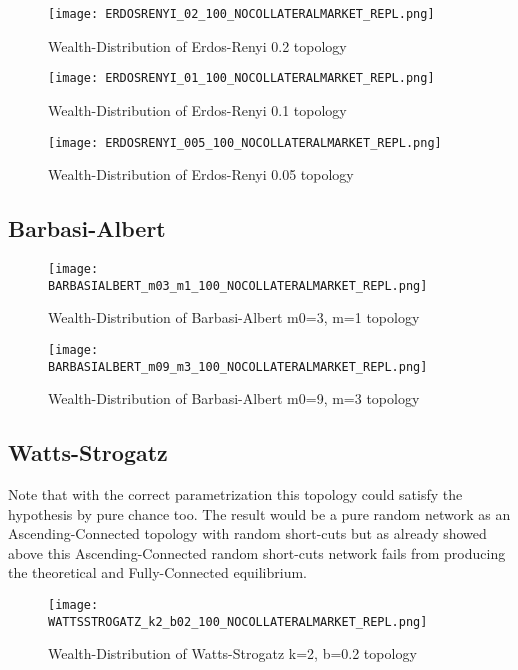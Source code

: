 \documentclass[Bachelorarbeit.tex]{subfiles}
\begin{document}
\begin{figure}[H]
	\centering
  \texttt{[image: ERDOSRENYI\_02\_100\_NOCOLLATERALMARKET\_REPL.png]}
	\caption{Wealth-Distribution of Erdos-Renyi 0.2 topology}
	\label{fig:wealth_ERDOSRENYI_02_100_NOCOLLATERALMARKET_REPL}
\end{figure}

\begin{figure}[H]
	\centering
  \texttt{[image: ERDOSRENYI\_01\_100\_NOCOLLATERALMARKET\_REPL.png]}
	\caption{Wealth-Distribution of Erdos-Renyi 0.1 topology}
	\label{fig:wealth_ERDOSRENYI_01_100_NOCOLLATERALMARKET_REPL}
\end{figure}

\begin{figure}[H]
	\centering
  \texttt{[image: ERDOSRENYI\_005\_100\_NOCOLLATERALMARKET\_REPL.png]}
	\caption{Wealth-Distribution of Erdos-Renyi 0.05 topology}
	\label{fig:wealth_ERDOSRENYI_005_100_NOCOLLATERALMARKET_REPL}
\end{figure}

\subsection{Barbasi-Albert}
\begin{figure}[H]
	\centering
  \texttt{[image: BARBASIALBERT\_m03\_m1\_100\_NOCOLLATERALMARKET\_REPL.png]}
	\caption{Wealth-Distribution of Barbasi-Albert m0=3, m=1 topology}
	\label{fig:wealth_BARBASIALBERT_m03_m1_100_NOCOLLATERALMARKET_REPL}
\end{figure}

\begin{figure}[H]
	\centering
  \texttt{[image: BARBASIALBERT\_m09\_m3\_100\_NOCOLLATERALMARKET\_REPL.png]}
	\caption{Wealth-Distribution of Barbasi-Albert m0=9, m=3 topology}
	\label{fig:wealth_BARBASIALBERT_m09_m3_100_NOCOLLATERALMARKET_REPL}
\end{figure}

\subsection{Watts-Strogatz}
Note that with the correct parametrization this topology could satisfy the hypothesis by pure chance too. The result would be a pure random network as an Ascending-Connected topology with random short-cuts but as already showed above this Ascending-Connected random short-cuts network fails from producing the theoretical and Fully-Connected equilibrium.

\begin{figure}[H]
	\centering
  \texttt{[image: WATTSSTROGATZ\_k2\_b02\_100\_NOCOLLATERALMARKET\_REPL.png]}
	\caption{Wealth-Distribution of Watts-Strogatz k=2, b=0.2 topology}
	\label{fig:wealth_WATTSSTROGATZ_k2_b02_100_NOCOLLATERALMARKET_REPL}
\end{figure}
\end{document}
